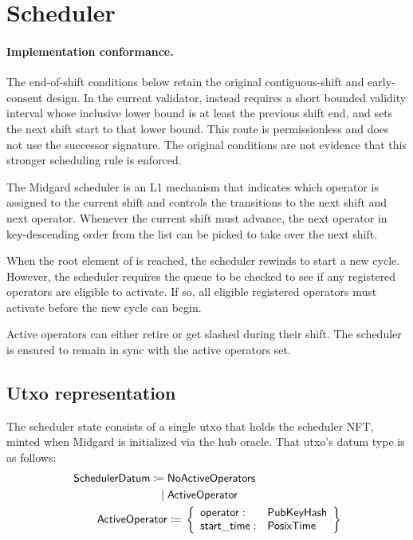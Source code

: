 \documentclass[../midgard.tex]{subfiles}
\begin{document}
\section{Scheduler}
\label{h:scheduler}

\paragraph{Implementation conformance.} The end-of-shift conditions below retain the original contiguous-shift and early-consent design. In the current  validator,  instead requires a short bounded validity interval whose inclusive lower bound is at least the previous shift end, and sets the next shift start to that lower bound. This route is permissionless and does not use the successor signature. The original conditions are not evidence that this stronger scheduling rule is enforced.

The Midgard scheduler is an L1 mechanism that indicates which operator is assigned to the current shift and controls the transitions to the next shift and next operator.
Whenever the current shift must advance, the next operator in key-descending order from the  list can be picked to take over the next shift.

When the root element of  is reached, the scheduler rewinds to start a new cycle.
However, the scheduler requires the  queue to be checked to see if any registered operators are eligible to activate.
If so, all eligible registered operators must activate before the new cycle can begin.

Active operators can either retire or get slashed during their shift.
The scheduler is ensured to remain in sync with the active operators set.

\subsection{Utxo representation}
\label{h:scheduler-utxo-representation}

The scheduler state consists of a single utxo that holds the scheduler NFT, minted when Midgard is initialized via the hub oracle.
That utxo's datum type is as follows:
\begin{align*}
    \mathsf{SchedulerDatum} \coloneq\;& \mathsf{NoActiveOperators} \\
                           \mid\;& \mathsf{ActiveOperator} \\
    \mathsf{ActiveOperator} &\coloneq{} \left\{
        \begin{array}{ll}
            \mathsf{operator} : & \mathsf{PubKeyHash} \\
            \mathsf{start\_time} : & \mathsf{PosixTime}
        \end{array} \right\}
\end{align*}
\end{document}
